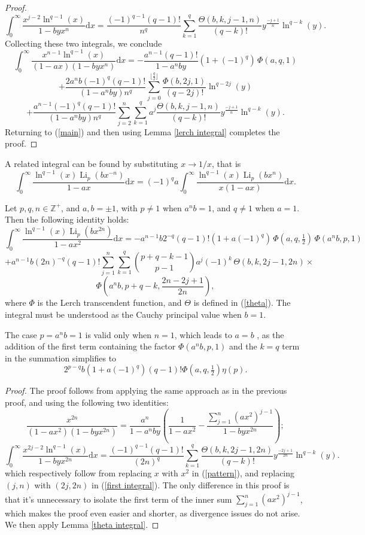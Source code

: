 \documentclass[11pt,reqno]{article}
\begin{document}
\begin{proof}
	\begin{equation}
		\int_0^\infty\frac{x^{j-2}\ln^{q-1}(x)}{1-byx^{n}}\mathrm{d} x=\frac{{(-1)}^{q-1}(q-1)!}{n^{q}}\sum_{k=1}^{q}\frac{\Theta(b,k,j-1,n)}{(q-k)!}y^{\frac{-j+1}{n}}\ln^{q-k}(y).\label{first integral}
	\end{equation}
	Collecting these two integrals, we conclude
	\[\int_0^\infty\frac{ x^{n-1}\ln^{q-1}(x)}{(1-ax)(1-byx^{n})}\mathrm{d} x
	=-\frac{a^{n-1}(q-1)!}{1-a^n by}(1+{(-1)}^{q})\,\Phi(a,q,1)\]
	\[+\frac{2a^nb{(-1)}^{q} (q-1)!}{(1-a^n by)n^{q}}\sum_{j=0}^{\lfloor\frac{q}{2}\rfloor}\frac{\Phi(b,2j,1)}{(q-2j)!}\ln^{q-2j}(y)\]
	\[+\frac{a^{n-1}{(-1)}^{q}(q-1)!}{(1-a^n by)n^{q}}\sum_{j=2}^n \sum_{k=1}^{q}a^{j}\frac{\Theta(b,k,j-1,n)}{(q-k)!}y^{\frac{-j+1}{n}}\ln^{q-k}(y).\]
	Returning to (\ref{main}) and then using Lemma \ref{lerch integral} completes the proof.
\end{proof}
A related integral can be found by substituting $x\to 1/x$, that is
\[\int_0^\infty\frac{\ln^{q-1}(x)\operatorname{Li}_{p}(bx^{-n})}{1-ax}\mathrm{d} x={(-1)}^{q}a\int_0^\infty\frac{\ln^{q-1}(x)\operatorname{Li}_{p}(bx^{n})}{x(1-ax)}\mathrm{d} x.\]

\begin{theorem}\label{infinity integral2}
	Let $p,q,n\in\mathbb{Z}^{+}$, and $a,b=\pm1$, with $p\neq1$ when $a^nb=1$, and $q\neq1$ when $a=1$. Then the following identity holds:
	\[\int_0^\infty\frac{\ln^{q-1}(x)\operatorname{Li}_p(b{x}^{2n})}{1-ax^2}\mathrm{d} x=-a^{n-1}b 2^{-q}(q-1)!(1+a{(-1)}^{q})\,\Phi(a,q,\tfrac12)\,\Phi(a^nb,p,1)\]
	\[+a^{n-1}b {(2n)}^{-q}(q-1)!\sum_{j=1}^{n}\sum_{k=1}^{q}\binom{p+q-k-1}{p-1}a^j{(-1)}^{k}\,\Theta(b,k,2j-1,2n)\times\]
	\[\Phi\left(a^nb,p+q-k,\frac{2n-2j+1}{2n}\right),\]
	where $\Phi$ is the Lerch transcendent function, and $\Theta$ is defined in (\ref{theta}). The integral must be understood as the Cauchy principal value when $b=1$.
\end{theorem}
\begin{remark}
	The case $p=a^nb=1$ is valid only when $n=1$, which leads to $a=b$ , as the addition of the first term containing the factor $\Phi(a^nb,p,1)$ and the $k=q$ term in the summation simplifies to \[2^{p-q}b(1+a{(-1)}^q)(q-1)!\Phi(a,q,\tfrac12)\eta(p).\] 
\end{remark}
\begin{proof}
	The proof follows from applying the same approach as in the previous proof, and using the following two identities:		
	\[\frac{x^{2n}}{(1-ax^2)(1-byx^{2n})}=\frac{a^n}{1-a^n by}\left(\frac{1}{1-ax^2}-\frac{\sum_{j=1}^n (ax^2)^{j-1}}{1-byx^{2n}}\right);\]
	\[\int_0^\infty\frac{x^{2j-2}\ln^{q-1}(x)}{1-byx^{2n}}\mathrm{d} x=\frac{{(-1)}^{q-1}(q-1)!}{{(2n)}^{q}}\sum_{k=1}^{q}\frac{\Theta(b,k,2j-1,2n)}{(q-k)!}y^{\frac{-2j+1}{2n}}\ln^{q-k}(y).\]
	which respectively follow from replacing $x$ with $x^2$ in (\ref{pattern}), and replacing $(j,n)$ with $(2j,2n)$ in (\ref{first integral}). The only difference in this proof is that it's unnecessary to isolate the first term of the inner sum $\sum_{j=1}^n (ax^2)^{j-1}$, which makes the proof even easier and shorter, as divergence issues do not arise. We then apply Lemma \ref{theta integral}.
\end{proof}
\end{document}
